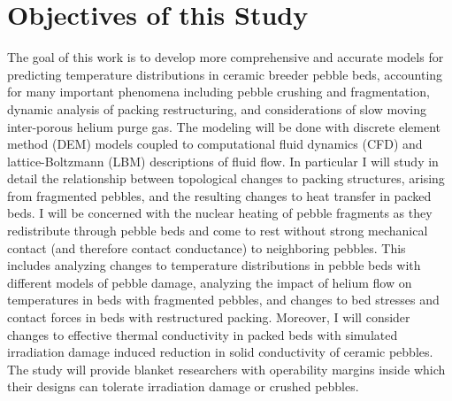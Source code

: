 \section{Objectives of this Study}\label{sec:intro-scope-of-work}
The goal of this work is to develop more comprehensive and accurate models for predicting temperature distributions in ceramic breeder pebble beds, accounting for many important phenomena including pebble crushing and fragmentation, dynamic analysis of packing restructuring, and considerations of slow moving inter-porous helium purge gas. The modeling will be done with discrete element method (DEM) models coupled to computational fluid dynamics (CFD) and lattice-Boltzmann (LBM) descriptions of fluid flow. In particular I will study in detail the relationship between topological changes to packing structures, arising from fragmented pebbles, and the resulting changes to heat transfer in packed beds. I will be concerned with the nuclear heating of pebble fragments as they redistribute through pebble beds and come to rest without strong mechanical contact (and therefore contact conductance) to neighboring pebbles. This includes analyzing changes to temperature distributions in pebble beds with different models of pebble damage, analyzing the impact of helium flow on temperatures in beds with fragmented pebbles, and changes to bed stresses and contact forces in beds with restructured packing. Moreover, I will consider changes to effective thermal conductivity in packed beds with simulated irradiation damage induced reduction in solid conductivity of ceramic pebbles. The study will provide blanket researchers with operability margins inside which their designs can tolerate irradiation damage or crushed pebbles.


